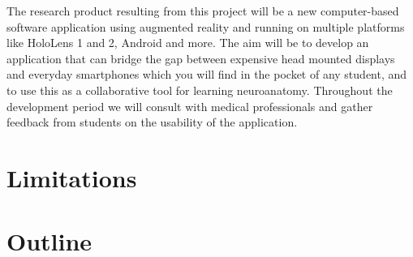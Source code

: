 The research product resulting from this project will be a new computer-based software application using augmented reality and running on multiple platforms like HoloLens 1 and 2, Android and more. The aim will be to develop an application that can bridge the gap between expensive head mounted displays and everyday smartphones which you will find in the pocket of any student, and to use this as a collaborative tool for learning neuroanatomy. Throughout the development period we will consult with medical professionals and gather feedback from students on the usability of the application.

\section{Limitations}

\section{Outline}

